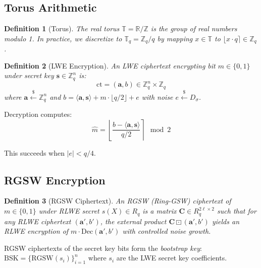 \documentclass[11pt,a4paper]{article}
\newtheorem{definition}{Definition}[section]
\begin{document}
\subsection{Torus Arithmetic}

\begin{definition}[Torus]
The real torus $\mathbb{T} = \mathbb{R}/\mathbb{Z}$ is the group of real numbers modulo 1.
In practice, we discretize to $\mathbb{T}_q = \mathbb{Z}_q / q$ by mapping $x \in \mathbb{T}$
to $\lfloor x \cdot q \rceil \in \mathbb{Z}_q$.
\end{definition}

\begin{definition}[LWE Encryption]
An LWE ciphertext encrypting bit $m \in \{0, 1\}$ under secret key $\mathbf{s} \in \mathbb{Z}_q^n$ is:
\[
\text{ct} = (\mathbf{a}, b) \in \mathbb{Z}_q^n \times \mathbb{Z}_q
\]
where $\mathbf{a} \stackrel{\$}{\leftarrow} \mathbb{Z}_q^n$ and $b = \langle \mathbf{a}, \mathbf{s} \rangle + m \cdot \lfloor q/2 \rfloor + e$
with noise $e \stackrel{\$}{\leftarrow} D_\sigma$.
\end{definition}

Decryption computes:
\begin{equation}
\hat{m} = \left\lfloor \frac{b - \langle \mathbf{a}, \mathbf{s} \rangle}{q/2} \right\rceil \mod 2
\label{eq:decrypt}
\end{equation}

This succeeds when $|e| < q/4$.

\subsection{RGSW Encryption}

\begin{definition}[RGSW Ciphertext]
An RGSW (Ring-GSW) ciphertext of $m \in \{0, 1\}$ under RLWE secret $s(X) \in R_q$
is a matrix $\mathbf{C} \in R_q^{2\ell \times 2}$ such that for any RLWE ciphertext
$(\mathbf{a}', b')$, the external product $\mathbf{C} \boxdot (\mathbf{a}', b')$
yields an RLWE encryption of $m \cdot \text{Dec}(\mathbf{a}', b')$ with controlled noise growth.
\end{definition}

RGSW ciphertexts of the secret key bits form the \emph{bootstrap key}:
$\text{BSK} = \{\text{RGSW}(s_i)\}_{i=1}^n$ where $s_i$ are the LWE secret key coefficients.

\end{document}
